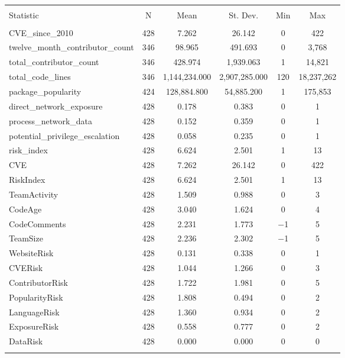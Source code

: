 \begin{table}[!htbp] \centering 
	\caption{} 
	\label{} 
	\begin{small}
	\begin{tabular}{@{\extracolsep{5pt}}lccccc} 
		\\[-1.8ex]\hline 
		\hline \\[-1.8ex] 
		Statistic & \multicolumn{1}{c}{N} & \multicolumn{1}{c}{Mean} & \multicolumn{1}{c}{St. Dev.} & \multicolumn{1}{c}{Min} & \multicolumn{1}{c}{Max} \\ 
		\hline \\[-1.8ex] 
		CVE\_since\_2010 & 428 & 7.262 & 26.142 & 0 & 422 \\ 
		twelve\_month\_contributor\_count & 346 & 98.965 & 491.693 & 0 & 3,768 \\ 
		total\_contributor\_count & 346 & 428.974 & 1,939.063 & 1 & 14,821 \\ 
		total\_code\_lines & 346 & 1,144,234.000 & 2,907,285.000 & 120 & 18,237,262 \\ 
		package\_popularity & 424 & 128,884.800 & 54,885.200 & 1 & 175,853 \\ 
		direct\_network\_exposure & 428 & 0.178 & 0.383 & 0 & 1 \\ 
		process\_network\_data & 428 & 0.152 & 0.359 & 0 & 1 \\ 
		potential\_privilege\_escalation & 428 & 0.058 & 0.235 & 0 & 1 \\ 
		risk\_index & 428 & 6.624 & 2.501 & 1 & 13 \\ 
		CVE & 428 & 7.262 & 26.142 & 0 & 422 \\ 
		RiskIndex & 428 & 6.624 & 2.501 & 1 & 13 \\ 
		TeamActivity & 428 & 1.509 & 0.988 & 0 & 3 \\ 
		CodeAge & 428 & 3.040 & 1.624 & 0 & 4 \\ 
		CodeComments & 428 & 2.231 & 1.773 & $-$1 & 5 \\ 
		TeamSize & 428 & 2.236 & 2.302 & $-$1 & 5 \\ 
		WebsiteRisk & 428 & 0.131 & 0.338 & 0 & 1 \\ 
		CVERisk & 428 & 1.044 & 1.266 & 0 & 3 \\ 
		ContributorRisk & 428 & 1.722 & 1.981 & 0 & 5 \\ 
		PopularityRisk & 428 & 1.808 & 0.494 & 0 & 2 \\ 
		LanguageRisk & 428 & 1.360 & 0.934 & 0 & 2 \\ 
		ExposureRisk & 428 & 0.558 & 0.777 & 0 & 2 \\ 
		DataRisk & 428 & 0.000 & 0.000 & 0 & 0 \\ 
		\hline \\[-1.8ex] 
	\end{tabular} 
	\end{small}
\end{table}

